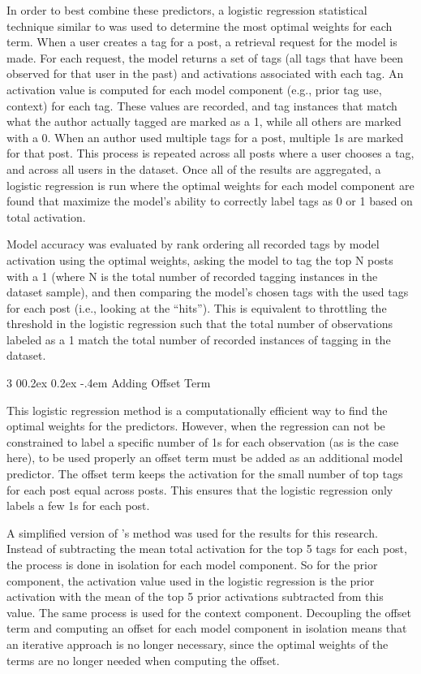 \documentclass[man,floatsintext,donotrepeattitle]{apa6}
\makeatletter
\renewcommand{\subsubsection}{%
  \@startsection
  {subsubsection}%
  {3}%
  {\parindent}%
  {0\baselineskip \@plus 0.2ex \@minus 0.2ex}%
  {-.4em}%
  {\normalfont\normalsize\bfseries\addperi}}
\makeatother
\begin{document}
In order to best combine these predictors, a logistic regression statistical technique similar to \textcite{Stanley2013} was used to determine the most optimal weights for each term.
When a user creates a tag for a post, a retrieval request for the model is made.
For each request, the model returns a set of tags (all tags that have been observed for that user in the past) and activations associated with each tag.
An activation value is computed for each model component (e.g., prior tag use, context) for each tag.
These values are recorded, and tag instances that match what the author actually tagged are marked as a 1, while all others are marked with a 0.
When an author used multiple tags for a post, multiple 1s are marked for that post.
This process is repeated across all posts where a user chooses a tag, and across all users in the dataset.
Once all of the results are aggregated, a logistic regression is run where the optimal weights for each model component are found that maximize the model's ability to correctly label tags as 0 or 1 based on total activation.

Model accuracy was evaluated by rank ordering all recorded tags by model activation using the optimal weights,
asking the model to tag the top N posts with a 1 (where N is the total number of recorded tagging instances in the dataset sample),
and then comparing the model's chosen tags with the used tags for each post (i.e., looking at the ``hits'').
This is equivalent to throttling the threshold in the logistic regression such that the total number of observations labeled as a 1 match the total number of recorded instances of tagging in the dataset.

\subsubsection{Adding Offset Term}

This logistic regression method is a computationally efficient way to find the optimal weights for the predictors.
However, when the regression can not be constrained to label a specific number of 1s for each observation (as is the case here), to be used properly an offset term must be added as an additional model predictor.
The offset term keeps the activation for the small number of top tags for each post equal across posts.
This ensures that the logistic regression only labels a few 1s for each post.

A simplified version of \textcite{Stanley2013}'s method was used for the results for this research.
Instead of subtracting the mean total activation for the top 5 tags for each post, the process is done in isolation for each model component.
So for the prior component, the activation value used in the logistic regression is the prior activation with the mean of the top 5 prior activations subtracted from this value.
The same process is used for the context component.
Decoupling the offset term and computing an offset for each model component in isolation means that an iterative approach is no longer necessary,
since the optimal weights of the terms are no longer needed when computing the offset.
\end{document}
